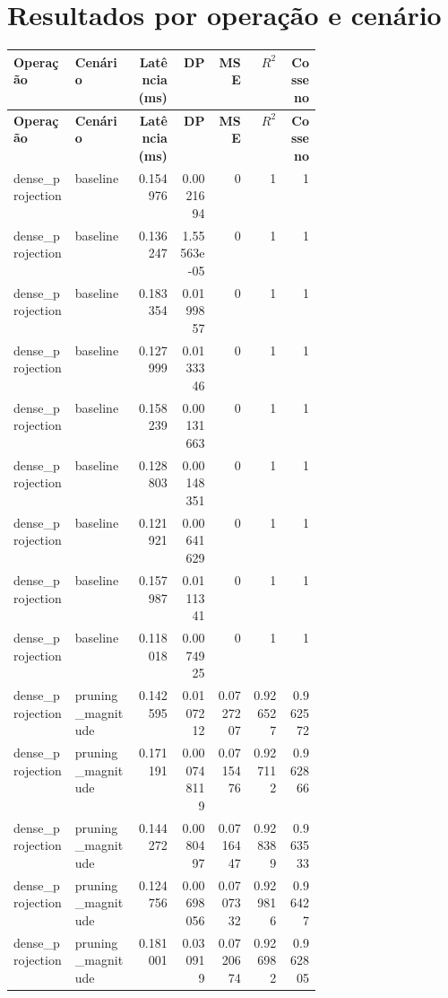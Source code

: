 \section{Resultados por operação e cenário}

\begin{landscape}
\small
\begin{longtable}{@{}p{0.20\linewidth}p{0.20\linewidth}rrrrr@{}}
\toprule
\textbf{Operação} & \textbf{Cenário} & \textbf{Latência (ms)} & \textbf{DP} & \textbf{MSE} & \textbf{$R^2$} & \textbf{Cosseno} \\
\midrule
\endfirsthead
\toprule
\textbf{Operação} & \textbf{Cenário} & \textbf{Latência (ms)} & \textbf{DP} & \textbf{MSE} & \textbf{$R^2$} & \textbf{Cosseno} \\
\midrule
\endhead
dense\_\allowbreak{}projection & baseline & 0.154976 & 0.0021694 & 0 & 1 & 1 \\
dense\_\allowbreak{}projection & baseline & 0.136247 & 1.55563e-05 & 0 & 1 & 1 \\
dense\_\allowbreak{}projection & baseline & 0.183354 & 0.0199857 & 0 & 1 & 1 \\
dense\_\allowbreak{}projection & baseline & 0.127999 & 0.0133346 & 0 & 1 & 1 \\
dense\_\allowbreak{}projection & baseline & 0.158239 & 0.00131663 & 0 & 1 & 1 \\
dense\_\allowbreak{}projection & baseline & 0.128803 & 0.00148351 & 0 & 1 & 1 \\
dense\_\allowbreak{}projection & baseline & 0.121921 & 0.00641629 & 0 & 1 & 1 \\
dense\_\allowbreak{}projection & baseline & 0.157987 & 0.0111341 & 0 & 1 & 1 \\
dense\_\allowbreak{}projection & baseline & 0.118018 & 0.0074925 & 0 & 1 & 1 \\
dense\_\allowbreak{}projection & pruning\_\allowbreak{}magnitude & 0.142595 & 0.0107212 & 0.0727207 & 0.926527 & 0.962572 \\
dense\_\allowbreak{}projection & pruning\_\allowbreak{}magnitude & 0.171191 & 0.000748119 & 0.0715476 & 0.927112 & 0.962866 \\
dense\_\allowbreak{}projection & pruning\_\allowbreak{}magnitude & 0.144272 & 0.0080497 & 0.0716447 & 0.928389 & 0.963533 \\
dense\_\allowbreak{}projection & pruning\_\allowbreak{}magnitude & 0.124756 & 0.00698056 & 0.0707332 & 0.929816 & 0.96427 \\
dense\_\allowbreak{}projection & pruning\_\allowbreak{}magnitude & 0.181001 & 0.030919 & 0.0720674 & 0.926982 & 0.962805 \\

\end{longtable}
\end{landscape}
